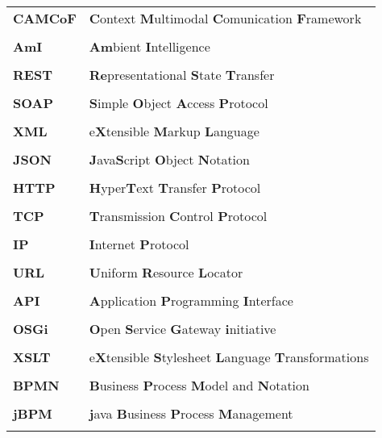 \documentclass[a4paper, 12pt, oneside]{Thesis}  %
\begin{document}
\begin{table}[!h]
\begin{tabular}{ll} 
	\textbf{CAMCoF}	& \textbf{C}ontext \textbf{M}ultimodal  \textbf{C}omunication \textbf{F}ramework	 \\ \\
	\textbf{AmI}	& \textbf{Am}bient \textbf{I}ntelligence	 \\ \\
	\textbf{REST}	& \textbf{Re}presentational \textbf{S}tate \textbf{T}ransfer	 \\ \\
	\textbf{SOAP}	& \textbf{S}imple \textbf{O}bject  \textbf{A}ccess \textbf{P}rotocol	 \\ \\
	\textbf{XML}	& e\textbf{X}tensible \textbf{M}arkup  \textbf{L}anguage	 \\ \\
	\textbf{JSON}	& \textbf{J}ava\textbf{S}cript  \textbf{O}bject \textbf{N}otation	 \\ \\
	\textbf{HTTP}	& \textbf{H}yper\textbf{T}ext  \textbf{T}ransfer \textbf{P}rotocol	 \\ \\
	\textbf{TCP}	& \textbf{T}ransmission \textbf{C}ontrol  \textbf{P}rotocol	 \\ \\
	\textbf{IP}	& \textbf{I}nternet \textbf{P}rotocol	 \\ \\
	\textbf{URL}	& \textbf{U}niform \textbf{R}esource  \textbf{L}ocator	 \\ \\
	\textbf{API}	& \textbf{A}pplication \textbf{P}rogramming  \textbf{I}nterface  \\ \\
	\textbf{OSGi}	& \textbf{O}pen \textbf{S}ervice  \textbf{G}ateway \textbf{i}nitiative	 \\ \\
	\textbf{XSLT}	& e\textbf{X}tensible \textbf{S}tylesheet  \textbf{L}anguage \textbf{T}ransformations	 \\ \\
	\textbf{BPMN}	& \textbf{B}usiness \textbf{P}rocess  \textbf{M}odel and \textbf{N}otation	 \\ \\
	\textbf{jBPM}	& \textbf{j}ava  \textbf{B}usiness \textbf{P}rocess \textbf{M}anagement	
 \\ \\

\end{tabular}
\end{table}
\end{document}
